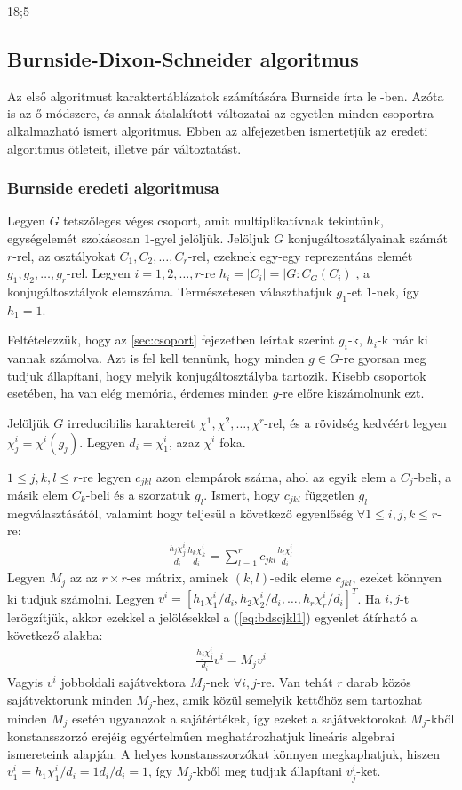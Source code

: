 18;5~\subsection{Burnside-Dixon-Schneider algoritmus}
\label{subsec:bds}
Az első algoritmust karaktertáblázatok számítására Burnside írta le \cite{Bur11}-ben. Azóta is az ő módszere, és annak átalakított változatai
az egyetlen minden csoportra alkalmazható ismert algoritmus.
Ebben az alfejezetben ismertetjük az eredeti algoritmus ötleteit, illetve pár változtatást.

\subsubsection{Burnside eredeti algoritmusa}
\label{subsubsec:bdseredeti}
Legyen $G$ tetszőleges véges csoport, amit multiplikatívnak tekintünk, egységelemét szokásosan $1$-gyel jelöljük.
Jelöljuk $G$ konjugáltosztályainak számát $r$-rel, az osztályokat $C_1, C_2, \dots, C_r$-rel, ezeknek egy-egy reprezentáns elemét $g_1, g_2, \dots, g_r$-rel.
Legyen $i=1, 2, \dots, r$-re $h_i=|C_i|=|G:C_G(C_i)|$, a konjugáltosztályok elemszáma.
Természetesen választhatjuk $g_1$-et $1$-nek, így $h_1=1$.

Feltételezzük, hogy az \ref{sec:csoport} fejezetben leírtak szerint $g_i$-k, $h_i$-k már ki vannak számolva.
Azt is fel kell tennünk, hogy minden $g\in G$-re gyorsan meg tudjuk állapítani, hogy melyik konjugáltosztályba tartozik.
Kisebb csoportok esetében, ha van elég memória, érdemes minden $g$-re előre kiszámolnunk ezt.

Jelöljük $G$ irreducibilis karaktereit $\chi^1, \chi^2, \dots, \chi^r$-rel, és a rövidség kedvéért legyen $\chi^i_j=\chi^i(g_j)$.
Legyen $d_i=\chi^i_1$, azaz $\chi^i$ foka.

$1 \le j, k, l \le r$-re legyen $c_{jkl}$ azon elempárok száma, ahol az egyik elem a $C_j$-beli, a másik elem $C_k$-beli és a szorzatuk $g_l$.
Ismert, hogy $c_{jkl}$ független $g_l$ megválasztásától, valamint hogy teljesül a következő egyenlőség $\forall 1 \le i, j, k \le r$-re:
\begin{align}
\label{eq:bdscjkl1}
\frac{h_j\chi^i_j}{d_i}\frac{h_k\chi^i_k}{d_i}=\sum_{l=1}^r c_{jkl}\frac{h_l\chi^i_l}{d_i}
\end{align}
Legyen $M_j$ az az $r\times r$-es mátrix, aminek $(k,l)$-edik eleme $c_{jkl}$, ezeket könnyen ki tudjuk számolni.
Legyen $v^i=[h_1\chi^i_1/d_i, h_2\chi^i_2/d_i, \dots, h_r\chi^i_r/d_i]^T$.
Ha $i, j$-t lerögzítjük, akkor ezekkel a jelölésekkel a (\ref{eq:bdscjkl1}) egyenlet átírható a következő alakba:
\begin{align}
\label{eq:bdscjkl2}
\frac{h_j\chi^i_j}{d_i}v^i=M_j v^i
\end{align}
Vagyis $v^i$ jobboldali sajátvektora $M_j$-nek $\forall i, j$-re.
Van tehát $r$ darab közös sajátvektorunk minden $M_j$-hez, amik közül semelyik kettőhöz sem tartozhat minden $M_j$ esetén ugyanazok a sajátértékek,
így ezeket a sajátvektorokat $M_j$-kből konstansszorzó erejéig egyértelműen meghatározhatjuk lineáris algebrai ismereteink alapján.
A helyes konstansszorzókat könnyen megkaphatjuk, hiszen $v^i_1=h_1\chi^i_1/d_i=1 d_i/d_i=1$, így $M_j$-kből meg tudjuk állapítani $v^i_j$-ket.

